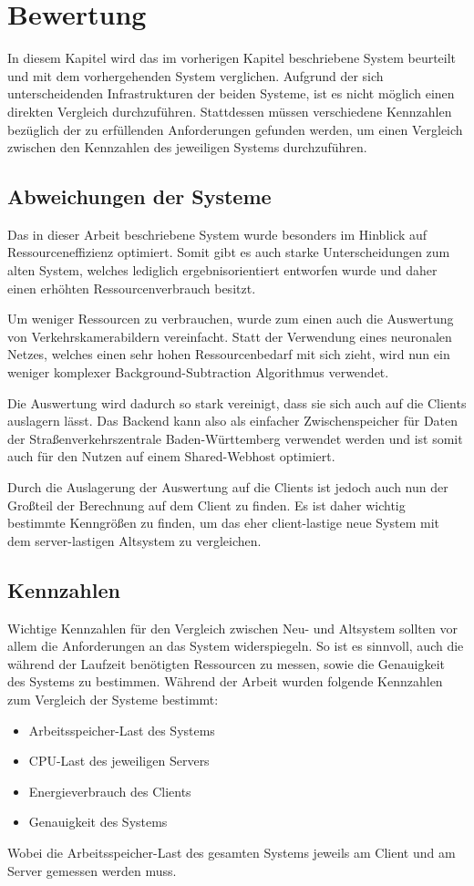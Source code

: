 \chapter{Bewertung}
In diesem Kapitel wird das im vorherigen Kapitel beschriebene System beurteilt und mit dem vorhergehenden System verglichen.
Aufgrund der sich unterscheidenden Infrastrukturen der beiden Systeme, ist es nicht möglich einen direkten Vergleich durchzuführen.
Stattdessen müssen verschiedene Kennzahlen bezüglich der zu erfüllenden Anforderungen gefunden werden, um einen Vergleich zwischen den Kennzahlen des jeweiligen Systems durchzuführen.

\section{Abweichungen der Systeme}
Das in dieser Arbeit beschriebene System wurde besonders im Hinblick auf Ressourceneffizienz optimiert.
Somit gibt es auch starke Unterscheidungen zum alten System, welches lediglich ergebnisorientiert entworfen wurde und daher einen erhöhten Ressourcenverbrauch besitzt.

Um weniger Ressourcen zu verbrauchen, wurde zum einen auch die Auswertung von Verkehrskamerabildern vereinfacht.
Statt der Verwendung eines neuronalen Netzes, welches einen sehr hohen Ressourcenbedarf mit sich zieht, wird nun ein weniger komplexer Background-Subtraction Algorithmus verwendet.

Die Auswertung wird dadurch so stark vereinigt, dass sie sich auch auf die Clients auslagern lässt.
Das Backend kann also als einfacher Zwischenspeicher für Daten der Straßenverkehrszentrale Baden-Württemberg verwendet werden und ist somit auch für den Nutzen auf einem Shared-Webhost optimiert.

Durch die Auslagerung der Auswertung auf die Clients ist jedoch auch nun der Großteil der Berechnung auf dem Client zu finden.
Es ist daher wichtig bestimmte Kenngrößen zu finden, um das eher client-lastige neue System mit dem server-lastigen Altsystem zu vergleichen.

\section{Kennzahlen}
Wichtige Kennzahlen für den Vergleich zwischen Neu- und Altsystem sollten vor allem die Anforderungen an das System widerspiegeln.
So ist es sinnvoll, auch die während der Laufzeit benötigten Ressourcen zu messen, sowie die Genauigkeit des Systems zu bestimmen.
Während der Arbeit wurden folgende Kennzahlen zum Vergleich der Systeme bestimmt:
\begin{itemize}
\item{Arbeitsspeicher-Last des Systems}
\item{CPU-Last des jeweiligen Servers}
\item{Energieverbrauch des Clients}
\item{Genauigkeit des Systems}
\end{itemize}
Wobei die Arbeitsspeicher-Last des gesamten Systems jeweils am Client und am Server gemessen werden muss.

